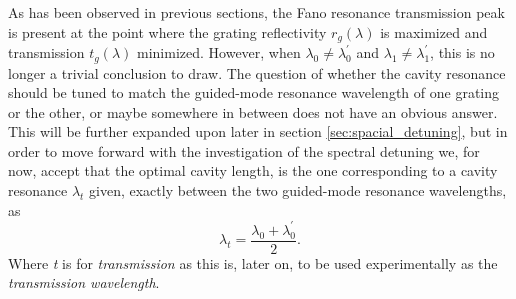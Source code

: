 As has been observed in previous sections, the Fano resonance transmission peak is present at the point where the grating reflectivity $r_g(\lambda)$ is maximized and transmission $t_g(\lambda)$ minimized. However, when $\lambda_0 \neq \lambda_0^{\prime}$ and $\lambda_1 \neq \lambda_1^{\prime}$, this is no longer a trivial conclusion to draw. The question of whether the cavity resonance should be tuned to match the guided-mode resonance wavelength of one grating or the other, or maybe somewhere in between does not have an obvious answer. This will be further expanded upon later in section \ref{sec:spacial_detuning}, but in order to move forward with the investigation of the spectral detuning we, for now, accept that the optimal cavity length, is the one corresponding to a cavity resonance $\lambda_t$ given, exactly between the two guided-mode resonance wavelengths, as 
\begin{equation}
    \lambda_t = \frac{\lambda_{0} + \lambda_{0}^{\prime}}{2}.
    \label{eq:transmission_wavelength}
\end{equation}
Where \emph{t} is for \emph{transmission} as this is, later on, to be used experimentally as the \emph{transmission wavelength}. 


